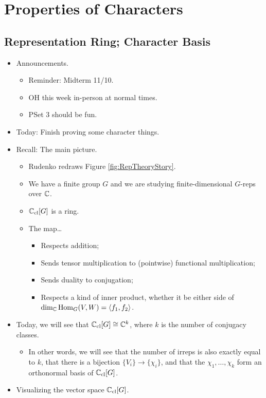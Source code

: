 \documentclass[../notes.tex]{subfiles}
\begin{document}
\chapter{Properties of Characters}
\section{Representation Ring; Character Basis}
\begin{itemize}
    \item {}Announcements.
    \begin{itemize}
        \item Reminder: Midterm 11/10.
        \item OH this week in-person at normal times.
        \item PSet 3 should be fun.
    \end{itemize}
    \item Today: Finish proving some character things.
    \item Recall: The main picture.
    \begin{itemize}
        \item Rudenko redraws Figure \ref{fig:RepTheoryStory}.
        \item We have a finite group $G$ and we are studying finite-dimensional $G$-reps over $\mathbb{C}$.
        \item $\mathbb{C}_\text{cl}[G]$ is a ring.
        \item The map\dots
        \begin{itemize}
            \item Respects addition;
            \item Sends tensor multiplication to (pointwise) functional multiplication;
            \item Sends duality to conjugation;
            \item Respects a kind of inner product, whether it be either side of $\dim_{\mathbb{C}}\operatorname{Hom}_G(V,W)=\left\langle{f_1,f_2}\right\rangle$.
        \end{itemize}
    \end{itemize}
    \item Today, we will see that $\mathbb{C}_\text{cl}[G]\cong\mathbb{C}^k$, where $k$ is the number of conjugacy classes.
    \begin{itemize}
        \item In other words, we will see that the number of irreps is also exactly equal to $k$, that there is a bijection $\{V_i\}\to\{\chi_i\}$, and that the $\chi_1,\dots,\chi_k$ form an orthonormal basis of $\mathbb{C}_\text{cl}[G]$.
    \end{itemize}
    \item Visualizing the vector space $\mathbb{C}_\text{cl}[G]$.
    \begin{figure}[h!]
        \centering
\end{figure}
\end{itemize}
\end{document}
